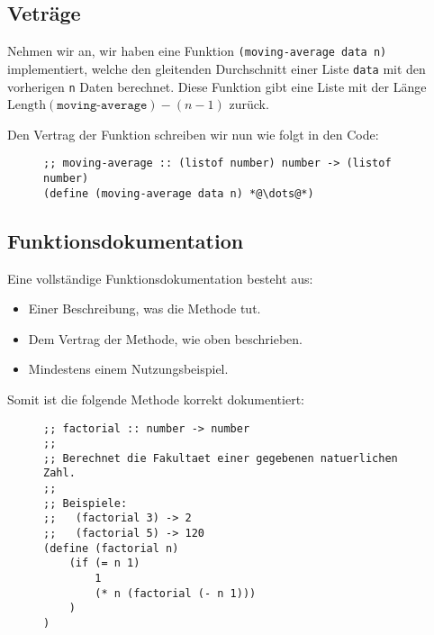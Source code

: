 
\subsection{Veträge}
	
	Nehmen wir an, wir haben eine Funktion \texttt{(moving-average data n)} implementiert, welche den gleitenden Durchschnitt einer Liste \texttt{data} mit den vorherigen \texttt{n} Daten berechnet. Diese Funktion gibt eine Liste mit der Länge \( \text{Length}(\texttt{moving-average}) - (n - 1) \) zurück.
	
	Den Vertrag der Funktion schreiben wir nun wie folgt in den Code:
	\begin{figure}[H]
		\centering
		\begin{lstlisting}[language = Racket]
;; moving-average :: (listof number) number -> (listof number)
(define (moving-average data n) *@\dots@*)
\end{lstlisting}
	\end{figure}

\subsection{Funktionsdokumentation}
	Eine vollständige Funktionsdokumentation besteht aus:
	\begin{itemize}
		\item Einer Beschreibung, was die Methode tut.
		\item Dem Vertrag der Methode, wie oben beschrieben.
		\item Mindestens einem Nutzungsbeispiel.
	\end{itemize}

	Somit ist die folgende Methode korrekt dokumentiert:
	\begin{figure}[H]
		\centering
		\begin{lstlisting}[language = Racket]
;; factorial :: number -> number
;;
;; Berechnet die Fakultaet einer gegebenen natuerlichen Zahl.
;;
;; Beispiele:
;;   (factorial 3) -> 2
;;   (factorial 5) -> 120
(define (factorial n)
	(if (= n 1)
		1
		(* n (factorial (- n 1)))
	)
)
\end{lstlisting}
	\end{figure}
